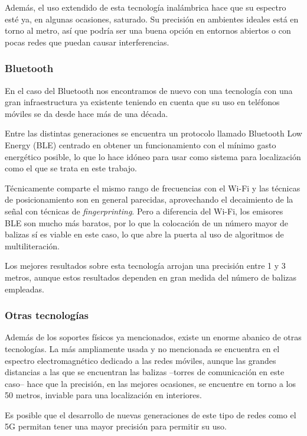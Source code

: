 Además, el uso extendido de esta tecnología inalámbrica hace que su espectro esté ya, en algunas ocasiones, saturado.
Su precisión en ambientes ideales está en torno al metro, así que podría ser una buena opción en entornos abiertos o con pocas redes que puedan causar interferencias.

\subsubsection{Bluetooth}

En el caso del Bluetooth nos encontramos de nuevo con una tecnología con una gran infraestructura ya existente teniendo en cuenta que su uso en teléfonos móviles se da desde hace más de una década.

Entre las distintas generaciones se encuentra un protocolo llamado Bluetooth Low Energy (BLE) centrado en obtener un funcionamiento con el mínimo gasto energético posible, lo que lo hace idóneo para usar como sistema para localización como el que se trata en este trabajo.

Técnicamente comparte el mismo rango de frecuencias con el Wi-Fi y las técnicas de posicionamiento son en general parecidas, aprovechando el decaimiento de la señal con técnicas de \textit{fingerprinting}.
Pero a diferencia del Wi-Fi, los emisores BLE son mucho más baratos, por lo que la colocación de un número mayor de balizas sí es viable en este caso, lo que abre la puerta al uso de algoritmos de multiliteración.

Los mejores resultados sobre esta tecnología arrojan una precisión entre 1 y 3 metros, aunque estos resultados dependen en gran medida del número de balizas empleadas.

\subsubsection{Otras tecnologías}

Además de los soportes físicos ya mencionados, existe un enorme abanico de otras tecnologías.
La más ampliamente usada y no mencionada se encuentra en el espectro electromagnético dedicado a las redes móviles, aunque las grandes distancias a las que se encuentran las balizas --torres de comunicación en este caso-- hace que la precisión, en las mejores ocasiones, se encuentre en torno a los 50 metros, inviable para una localización en interiores.

Es posible que el desarrollo de nuevas generaciones de este tipo de redes como el 5G permitan tener una mayor precisión para permitir su uso.

